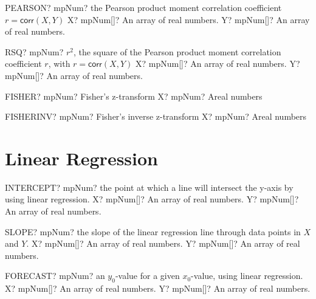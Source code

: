 \documentclass[12pt,a4paper,openany]{book}
\begin{document}
\begin{mpFunctionsExtract}
\mpWorksheetFunctionTwoNotImplemented
{PEARSON? mpNum? the Pearson product moment correlation coefficient  $r = \textsf{corr}(X,Y)$}
{X? mpNum[]? An array of real numbers.}
{Y? mpNum[]? An array of real numbers.}
\end{mpFunctionsExtract}

\begin{mpFunctionsExtract}
\mpWorksheetFunctionTwoNotImplemented
{RSQ? mpNum? $r^2$, the square of the Pearson product moment correlation coefficient $r$, with $r = \textsf{corr}(X,Y)$}
{X? mpNum[]? An array of real numbers.}
{Y? mpNum[]? An array of real numbers.}
\end{mpFunctionsExtract}

\begin{mpFunctionsExtract}
\mpWorksheetFunctionOneNotImplemented
{FISHER? mpNum? Fisher's z-transform}
{X? mpNum? Areal numbers}
\end{mpFunctionsExtract}

\begin{mpFunctionsExtract}
\mpWorksheetFunctionOneNotImplemented
{FISHERINV? mpNum? Fisher's inverse z-transform}
{X? mpNum? Areal numbers}
\end{mpFunctionsExtract}

\section{Linear Regression}

\begin{mpFunctionsExtract}
\mpWorksheetFunctionTwoNotImplemented
{INTERCEPT? mpNum? the point at which a line will intersect the y-axis by using linear regression.}
{X? mpNum[]? An array of real numbers.}
{Y? mpNum[]? An array of real numbers.}
\end{mpFunctionsExtract}

\begin{mpFunctionsExtract}
\mpWorksheetFunctionTwoNotImplemented
{SLOPE? mpNum? the slope of the linear regression line through data points in $X$ and $Y$.}
{X? mpNum[]? An array of real numbers.}
{Y? mpNum[]? An array of real numbers.}
\end{mpFunctionsExtract}

\begin{mpFunctionsExtract}
\mpWorksheetFunctionTwoNotImplemented
{FORECAST? mpNum? an $y_0$-value for a given $x_0$-value, using linear regression.}
{X? mpNum[]? An array of real numbers.}
{Y? mpNum[]? An array of real numbers.}
\end{mpFunctionsExtract}
\end{document}
